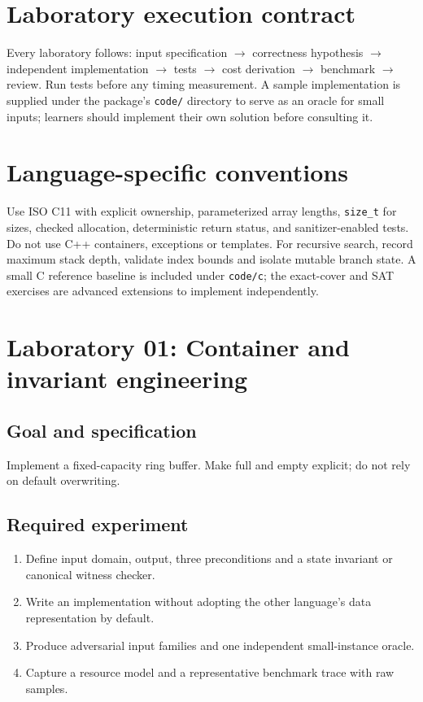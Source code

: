 \documentclass[11pt,letterpaper]{article}
\begin{document}
\tableofcontents
\clearpage
{}
\section{Laboratory execution contract}
Every laboratory follows: input specification $\rightarrow$ correctness hypothesis $\rightarrow$ independent implementation $\rightarrow$ tests $\rightarrow$ cost derivation $\rightarrow$ benchmark $\rightarrow$ review. Run tests before any timing measurement. A sample implementation is supplied under the package's \texttt{code/} directory to serve as an oracle for small inputs; learners should implement their own solution before consulting it.
\section{Language-specific conventions}

Use ISO C11 with explicit ownership, parameterized array lengths, \texttt{size\_t} for sizes, checked allocation, deterministic return status, and sanitizer-enabled tests. Do not use C++ containers, exceptions or templates. For recursive search, record maximum stack depth, validate index bounds and isolate mutable branch state. A small C reference baseline is included under \texttt{code/c}; the exact-cover and SAT exercises are advanced extensions to implement independently.
\section{Laboratory 01: Container and invariant engineering}
\subsection{Goal and specification}
Implement a fixed-capacity ring buffer. Make full and empty explicit; do not rely on default overwriting.
\subsection{Required experiment}
\begin{enumerate}
\item Define input domain, output, three preconditions and a state invariant or canonical witness checker.
\item Write an implementation without adopting the other language's data representation by default.
\item Produce adversarial input families and one independent small-instance oracle.
\item Capture a resource model and a representative benchmark trace with raw samples.
\end{enumerate}
\end{document}
